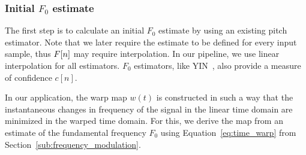 \subsubsection{Initial $F_0$ estimate}
\label{ssub:initial_estimate}

The first step is to calculate an initial $F_0$ estimate by using an existing pitch estimator. Note that we later require the estimate to be defined for every input sample, thus ${F}[n]$ may require interpolation. In our pipeline, we use linear interpolation for all estimators. $F_0$ estimators, like YIN~\cite{decheveigne02}, also provide a measure of confidence $c[n]$.
\par
%
%

In our application, the warp map $w(t)$ is constructed in such a way that the instantaneous changes in frequency of the signal in the linear time domain are minimized in the warped time domain. For this, we derive the map from an estimate of the fundamental frequency $F_0$ using Equation~\ref{eq:time_warp} from Section~\ref{sub:frequency_modulation}.


